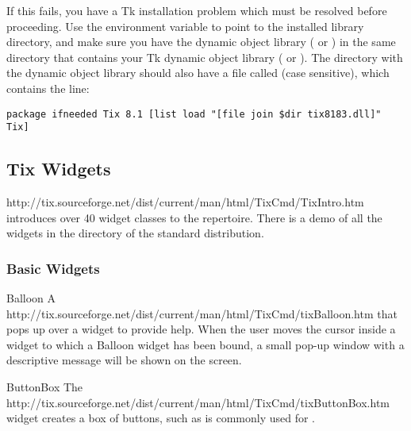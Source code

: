 If this fails, you have a Tk installation problem which must be
resolved before proceeding. Use the environment variable 
to point to the installed  library directory, and
make sure you have the dynamic object library ( or
) in  the same directory that contains your Tk
dynamic object library ( or ). The
directory with the dynamic object library should also have a file
called  (case sensitive), which contains the line:

\begin{verbatim}
package ifneeded Tix 8.1 [list load "[file join $dir tix8183.dll]" Tix]
\end{verbatim} %


\subsection{Tix Widgets}

{http://tix.sourceforge.net/dist/current/man/html/TixCmd/TixIntro.htm}
introduces over 40 widget classes to the  
repertoire.  There is a demo of all the  widgets in the
 directory of the standard distribution.




\subsubsection{Basic Widgets}

\begin{classdesc}{Balloon}{}
A 
{http://tix.sourceforge.net/dist/current/man/html/TixCmd/tixBalloon.htm}
that pops up over a widget to provide help.  When the user moves the
cursor inside a widget to which a Balloon widget has been bound, a
small pop-up window with a descriptive message will be shown on the
screen.
\end{classdesc}


\begin{classdesc}{ButtonBox}{}
The 
{http://tix.sourceforge.net/dist/current/man/html/TixCmd/tixButtonBox.htm}
widget creates a box of buttons, such as is commonly used for .
\end{classdesc}

